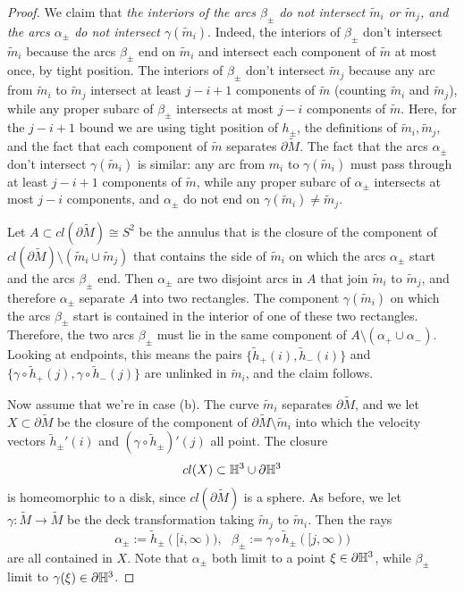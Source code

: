\documentclass[12pt]{amsart}
\theoremstyle{definition}
\theoremstyle{remark}
\begin{document}
\begin {proof}
We claim that \emph{the {interiors} of the arcs $\beta_\pm$ do not intersect $\tilde m_i$ or $\tilde m_j$, and the arcs $\alpha_\pm$ do not intersect $\gamma(\tilde m_i)$}. Indeed, the interiors of $\beta_\pm$ don't intersect $\tilde m_i$ because the arcs $\beta_\pm$ end on $\tilde m_i$ and intersect each component of $\tilde m$ at most once, by tight position. The interiors of $\beta_\pm$  don't intersect $\tilde m_j$ because any arc from $\tilde m_i$ to $\tilde m_j$ intersect at least $j-i+1$ components of $\tilde m$ (counting $\tilde m_i$ and $\tilde m_j$), while any proper subarc of $\beta_\pm$ intersects at most $j-i$ components of $\tilde m$. Here, for the $j-i+1$ bound we are using tight position of $h_\pm$, the definitions of $\tilde m_i,\tilde m_j$, and the fact that each component of $\tilde m$ separates $\partial \tilde M$. The fact that the arcs $\alpha_\pm$ don't intersect $\gamma(\tilde m_i)$ is similar: any arc from $m_i$ to $\gamma(\tilde m_i)$ must pass through at least $j-i+1$ components of $\tilde m$, while any proper subarc of $\alpha_\pm$ intersects at most $j-i$ components, and $\alpha_\pm$ do not end on $\gamma(\tilde m_i)\neq \tilde m_j$.

Let $A \subset cl(\partial \tilde M)\cong S^2$ be the annulus that is the closure of the component of $cl(\partial \tilde M) \setminus (\tilde m_i \cup \tilde m_j)$ that contains the side of $\tilde m_i$ on which the arcs $\alpha_\pm$ start and the arcs $\beta_\pm$ end. Then $\alpha_\pm$ are two disjoint arcs in $A$  that join $\tilde m_i $ to $\tilde m_j$, and therefore $\alpha_\pm$ separate $A$ into two rectangles.  The component $\gamma(\tilde m_i)$ on which the arcs $\beta_\pm$ start is contained in the interior of one of these two rectangles. Therefore, the two arcs $\beta_\pm$ must lie in the same component of $A \setminus (\alpha_+ \cup \alpha_-).$ Looking at endpoints, this means the pairs $\{\tilde h_+(i),\tilde h_-(i)\} $ and $\{\gamma \circ \tilde h_+(j),\gamma \circ \tilde h_-(j)\}$ are unlinked in $\tilde m_i$, and the claim follows.

\medskip

Now assume that we're in case (b). The curve $\tilde m_i$ separates $\partial\tilde M$, and we let $X\subset \partial\tilde M$ be the closure of the component of $\partial \tilde M \setminus \tilde m_i$ into which the velocity vectors $\tilde h_\pm'(i)$ and $(\gamma \circ \tilde h_\pm)'(j)$ all point. The closure $$ cl(X)  \subset \mathbb H^3 \cup \partial \mathbb H^3$$ is homeomorphic to a disk, since $cl(\partial \tilde M)$ is a sphere. As before, we let $\gamma : \tilde M \longrightarrow \tilde M$ be the deck transformation taking $\tilde m_j$ to $\tilde m_i$.  Then the rays $$\alpha_\pm := \tilde h_\pm([i,\infty)), \ \ \ \beta_\pm:=\gamma \circ \tilde h_\pm([j,\infty))$$  are all contained in $X$. Note that $\alpha_\pm$ both limit to a point $\xi\in \partial \mathbb H^3$, while $\beta_\pm$ limit to $\gamma(\xi) \in \partial \mathbb H^3$. 


\end{proof}
\end{document}
